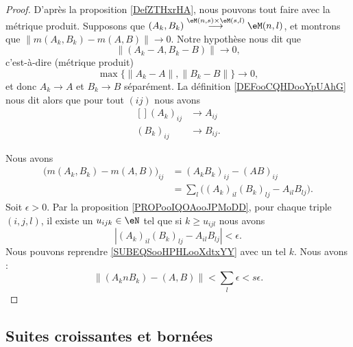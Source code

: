 \begin{proof}
	D'après la proposition \ref{DefZTHxrHA}, nous pouvons tout faire avec la métrique produit. Supposons que \( (A_k,B_k)  \stackrel{ \eM(n,s)\times \eM(s,l) }{\longrightarrow} \eM(n,l) \), et montrons que \( \| m(A_k,B_k)-m(A,B) \|\to 0\). Notre hypothèse nous dit que
	\begin{equation}
		\| (A_k-A,B_k-B) \|\to 0,
	\end{equation}
	c'est-à-dire (métrique produit)
	\begin{equation}
		\max\big\{  \| A_k-A \|,\| B_k-B \| \big\}\to 0,
	\end{equation}
	et donc \( A_k\to A\) et \( B_k\to B\) séparément. La définition \ref{DEFooCQHDooYpUAhG} nous dit alors que pour tout \( (ij)\) nous avons
	\begin{equation}
		\begin{aligned}[]
			(A_k)_{ij} & \to A_{ij}  \\
			(B_k)_{ij} & \to B_{ij}.
		\end{aligned}
	\end{equation}

	Nous avons
	\begin{subequations}		\label{SUBEQSooHPHLooXdtxYY}
		\begin{align}
			\Big( m(A_k,B_k)-m(A,B) \Big)_{ij} & =(A_kB_k)_{ij}-(AB)_{ij}                               \\
			                                   & = \sum_l\Big( (A_k)_{il}(B_k)_{lj}-A_{il}B_{lj} \Big).
		\end{align}
	\end{subequations}
	Soit \( \epsilon>0\). Par la proposition \ref{PROPooIQOAooJPMoDD}, pour chaque triple \( (i,j,l)\), il existe un \( u_{ijk}\in \eN\) tel que si \( k\geq u_{ijl}\) nous avons
	\begin{equation}
		| (A_k)_{il}(B_k)_{lj}-A_{il}B_{lj} |<\epsilon.
	\end{equation}
	Nous pouvons reprendre \eqref{SUBEQSooHPHLooXdtxYY} avec un tel \( k\). Nous avons :
	\begin{equation}
		\| (A_knB_k)-(A,B) \|<\sum_l\epsilon<s\epsilon.
	\end{equation}
\end{proof}

\subsection{Suites croissantes et bornées}

